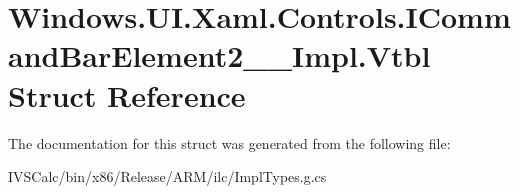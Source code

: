 \hypertarget{struct_windows_1_1_u_i_1_1_xaml_1_1_controls_1_1_i_command_bar_element2_____impl_1_1_vtbl}{}\section{Windows.\+U\+I.\+Xaml.\+Controls.\+I\+Command\+Bar\+Element2\+\_\+\+\_\+\+Impl.\+Vtbl Struct Reference}
\label{struct_windows_1_1_u_i_1_1_xaml_1_1_controls_1_1_i_command_bar_element2_____impl_1_1_vtbl}


The documentation for this struct was generated from the following file\+:\begin{DoxyCompactItemize}
\item 
I\+V\+S\+Calc/bin/x86/\+Release/\+A\+R\+M/ilc/Impl\+Types.\+g.\+cs\end{DoxyCompactItemize}
